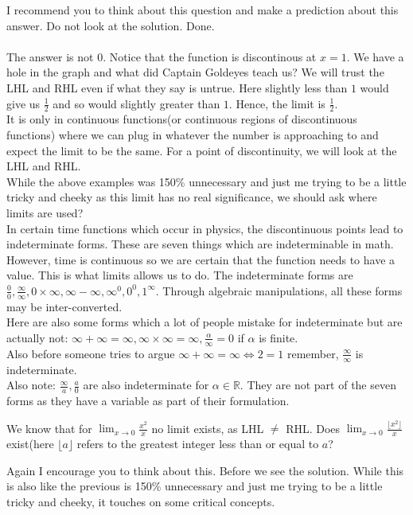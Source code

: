 I recommend you to think about this question and make a prediction about this answer. Do not look at the solution. Done.\\
\\
The answer is not $0$. Notice that the function is discontinous at $x=1$. We have a hole in the graph and what did Captain Goldeyes teach us? We will trust the LHL and RHL even if what they say is untrue. Here slightly less than $1$ would give us $\frac{1}{2}$ and so would slightly greater than $1$. Hence, the limit is $\frac{1}{2}$.\\
It is only in continuous functions(or continuous regions of discontinuous functions) where we can plug in whatever the number is approaching to and expect the limit to be the same. For a point of discontinuity, we will look at the LHL and RHL.\\
While the above examples was 150\% unnecessary and just me trying to be a little tricky and cheeky as this limit has no real significance, we should ask where limits are used?\\
In certain time functions which occur in physics, the discontinuous points lead to indeterminate forms. These are seven things which are indeterminable in math. However, time is continuous so we are certain that the function needs to have a value. This is what limits allows us to do. The indeterminate forms are $\frac{0}{0}, \frac{\infty}{\infty}, 0 \times \infty, \infty - \infty, \infty^0, 0^0, 1^{\infty}$. Through algebraic manipulations, all these forms may be inter-converted.\\
Here are also some forms which a lot of people mistake for indeterminate but are actually not: $\infty+\infty=\infty, \infty \times \infty = \infty, \frac{\alpha}{\infty}=0$ if $\alpha$ is finite.\\ 
Also before someone tries to argue $\infty+\infty=\infty \iff 2=1$ remember, $\frac{\infty}{\infty}$ is indeterminate.\\
Also note: $\frac{\infty}{a}, \frac{a}{0}$ are also indeterminate for $\alpha \in \mathbb{R}$. They are not part of the seven forms as they have a variable as part of their formulation.\\
\begin{example}
    We know that for $\lim_{x \to 0}\frac{x^2}{x}$ no limit exists, as LHL $\neq$ RHL. Does $\lim_{x \to 0}\frac{\lfloor x^2 \rfloor}{x}$ exist(here $\lfloor a \rfloor$ refers to the greatest integer less than or equal to $a$?
\end{example}
Again I encourage you to think about this. Before we see the solution. While this is also like the previous is 150\% unnecessary and just me trying to be a little tricky and cheeky, it touches on some critical concepts.\\
